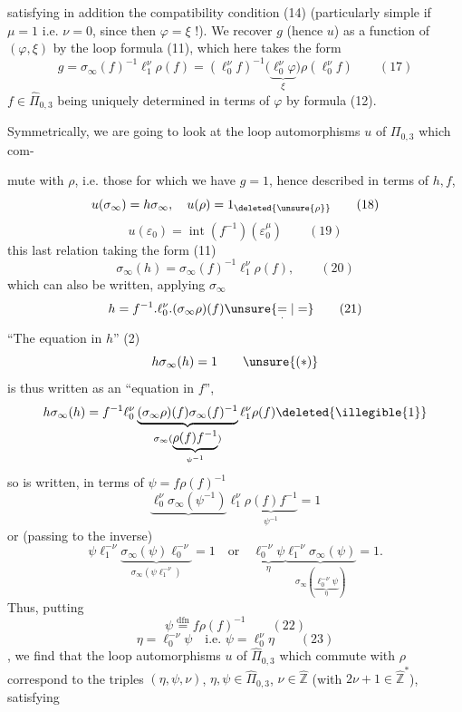 
satisfying in addition the compatibility condition (14) (particularly simple  if $\mu=1$ i.e. \deleted{$\mu=$} $\nu=0$, since then $\varphi=\xi$ !). We recover $g$ (hence $u$)  as a function
of $(\varphi,\xi)$ by the loop formula (11), which here takes the form
\[
g=\sigma_\infty(f)^{-1}\ell_1^\nu\rho(f)
=(\ell_0^\nu f)^{-1}\bigl(\underbrace{\ell_0^\nu\varphi}_{\xi}\bigr)\rho(\ell_0^\nu f)
\qquad (17)
\]
$f\in\widehat{\Pi}_{0,3}$ being uniquely determined in terms of $\varphi$ by formula (12).

Symmetrically, we are going to look at the loop automorphisms $u$ of $\Pi_{0,3}$ which com-



mute with $\rho$, i.e. those for which we have $g=1$, hence described in terms of $h,f$,
\[
u(\sigma_\infty)=h\sigma_\infty,\quad u(\rho)=1_{\deleted{\unsure{\rho}}}\qquad (18)
\]
\[
u(\varepsilon_0)=\operatorname{int}(f^{-1})(\varepsilon_0^\mu)
\qquad (19)
\]
this last relation taking the form (11)
\[
\sigma_\infty(h)=\sigma_\infty(f)^{-1}\ell_1^\nu\rho(f),
\qquad (20)
\]
which can also be written, applying $\sigma_\infty$
\[
h=f^{-1}.\ell_0^\nu.(\sigma_\infty\rho)(f)\unsure{\underset{\cdot}{=}|=}
\qquad (21)
\]
``The equation in $h$'' (2) 
\[
h\sigma_\infty(h)=1
\qquad \unsure{(*)}
\]
is thus written as an ``equation in $f$'',  
\[
h\sigma_\infty(h)=f^{-1}\ell_0^\nu
\underbrace{(\sigma_\infty\rho)(f)\sigma_\infty(f)^{-1}}_{\sigma_\infty(\underbrace{\rho(f)f^{-1}}_{\psi^{-1}})}
\ell_1^\nu\rho(f)\deleted{\illegible{1}}
\]
so  is written, in terms of $\psi=f\rho(f)^{-1}$
\[
\underbrace{\ell_0^\nu\sigma_\infty(\psi^{-1})}\ell_1^\nu
\underbrace{\rho(f)f^{-1}}_{\psi^{-1}}=1
\]
or (passing to the inverse)
\[
\psi\ell_1^{-\nu}\underbrace{\sigma_\infty(\psi)\ell_0^{-\nu}}_{\sigma_\infty(\psi\ell_1^{-\nu})}=1
\quad\text{or}\quad
\underbrace{\ell_0^{-\nu}\psi}_{\eta}
\underbrace{\ell_1^{-\nu}\sigma_\infty(\psi)}_{\sigma_\infty(\underbrace{\ell_0^{-\nu}\psi}_{\eta})}=1.
\]
Thus, putting
\[
\psi\overset{\mathrm{dfn}}{=}f\rho(f)^{-1}
\qquad (22)
\]
\[
\boxed{\eta=\ell_0^{-\nu}\psi\quad\text{i.e. }\psi=\ell_0^\nu\eta}
\qquad (23)
\]
, we find that the loop automorphisms $u$ of $\widehat{\Pi}_{0,3}$ which commute with $\rho$ correspond to the triples $(\eta,\psi,\nu)$, $\eta,\psi\in\widehat{\Pi}_{0,3}$, $\nu\in\widehat{\mathbb Z}$ (with $2\nu+1\in\widehat{\mathbb Z}^{*}$), satisfying

